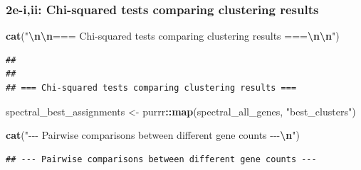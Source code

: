 \documentclass[
]{article}
\newenvironment{Shaded}{\begin{snugshade}}{\end{snugshade}}
\newcommand{\FunctionTok}[1]{\textcolor[rgb]{0.13,0.29,0.53}{\textbf{#1}}}
\newcommand{\NormalTok}[1]{#1}
\newcommand{\OtherTok}[1]{\textcolor[rgb]{0.56,0.35,0.01}{#1}}
\newcommand{\SpecialCharTok}[1]{\textcolor[rgb]{0.81,0.36,0.00}{\textbf{#1}}}
\newcommand{\StringTok}[1]{\textcolor[rgb]{0.31,0.60,0.02}{#1}}
\begin{document}
\subsubsection{2e-i,ii: Chi-squared tests comparing clustering
results}\label{e-iii-chi-squared-tests-comparing-clustering-results}

\begin{Shaded}
\begin{Highlighting}[]
\FunctionTok{cat}\NormalTok{(}\StringTok{"}\SpecialCharTok{\textbackslash{}n\textbackslash{}n}\StringTok{=== Chi{-}squared tests comparing clustering results ===}\SpecialCharTok{\textbackslash{}n\textbackslash{}n}\StringTok{"}\NormalTok{)}
\end{Highlighting}
\end{Shaded}

\begin{verbatim}
## 
## 
## === Chi-squared tests comparing clustering results ===
\end{verbatim}

\begin{Shaded}
\begin{Highlighting}[]
\NormalTok{spectral\_best\_assignments }\OtherTok{\textless{}{-}}\NormalTok{ purrr}\SpecialCharTok{::}\FunctionTok{map}\NormalTok{(spectral\_all\_genes, }\StringTok{"best\_clusters"}\NormalTok{)}

\FunctionTok{cat}\NormalTok{(}\StringTok{"{-}{-}{-} Pairwise comparisons between different gene counts {-}{-}{-}}\SpecialCharTok{\textbackslash{}n}\StringTok{"}\NormalTok{)}
\end{Highlighting}
\end{Shaded}

\begin{verbatim}
## --- Pairwise comparisons between different gene counts ---
\end{verbatim}
\end{document}
